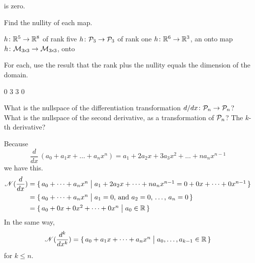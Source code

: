 \begin{exercises}
\begin{answer}
\begin{exparts}
          is zero.
      \end{exparts}  
    \end{answer}
  \recommended \item 
    Find the nullity of each map.
    \begin{exparts*}
      \partsitem \( \mbox{$h\colon \mathbb{R}^5\to \mathbb{R}^8$} \) of rank five
      \partsitem \( \mbox{$h\colon \mathcal{P}_3\to \mathcal{P}_3$} \) of rank one
      \partsitem \( \mbox{$h\colon \mathbb{R}^6\to \mathbb{R}^3$} \), an onto map
      \partsitem \( \mbox{$h\colon \mathcal{M}_{3 \! \times \! 3}\to \mathcal{M}_{3 \! \times \! 3}$} \),
        onto
    \end{exparts*}
    \begin{answer}
      For each, use the result 
      that the rank plus the nullity equals the dimension of the domain.
      \begin{exparts*}
        \partsitem $0$
        \partsitem $3$ 
        \partsitem $3$
        \partsitem $0$
      \end{exparts*}
    \end{answer}
  \recommended \item 
    What is the nullspace of the differentiation transformation
    \( \mbox{$d/dx\colon \mathcal{P}_n\to \mathcal{P}_n$} \)?
    What is the nullspace of the second derivative, as a
    transformation of \( \mathcal{P}_n \)?
    The \( k \)-th derivative?
    \begin{answer}
      Because
      \begin{equation*}
        \frac{d}{dx}\,(a_0+a_1x+\dots+a_nx^n)
        =a_1+2a_2x+3a_3x^2+\dots+na_nx^{n-1}
      \end{equation*}
      we have this.
      \begin{align*}
        \mathscr{N}(\frac{d}{dx})
        &=\mbox{$\{\,a_0+\dots+a_nx^n\bigm| a_1+2a_2x+\dots+na_nx^{n-1}
                                         =0+0x+\dots+0x^{n-1}\,\}$}       \\
        &=\mbox{$\{\,a_0+\dots+a_nx^n\bigm| 
               \text{$a_1=0$, and $a_2=0$, \ldots, $a_n=0$}\,\}$}  \\
        &=\mbox{$\{\,a_0+0x+0x^2+\dots+0x^n\bigm| a_0\in\mathbb{R}\,\}$}
      \end{align*}
      In the same way, 
      \begin{equation*}
        \mathscr{N}(\frac{d^k}{dx^k})
        =\mbox{$\{\,a_0+a_1x+\dots+a_nx^n\bigm| a_0,\dots,a_{k-1}\in\mathbb{R}\,\}$}
      \end{equation*}
      for \( k\leq n \).  
    \end{answer}
  \item  \label{exer:CondTwoProjMap}

\end{exercises}

